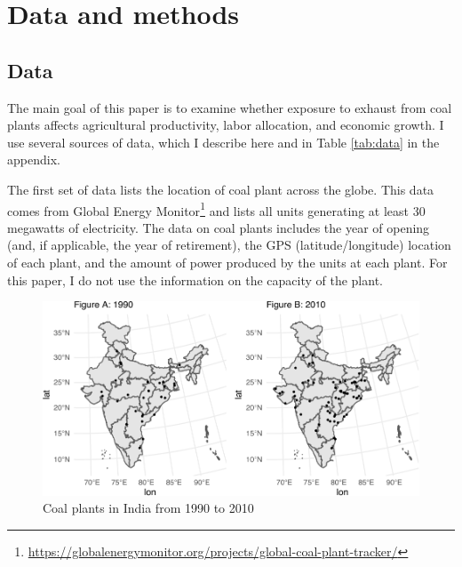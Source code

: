 \documentclass[
]{article}
\begin{document}
\hypertarget{data-and-methods}{%
\section{\texorpdfstring{Data and methods \label{data}}{Data and methods }}\label{data-and-methods}}

\hypertarget{data}{%
\subsection{\texorpdfstring{Data \label{data2}}{Data }}\label{data}}

The main goal of this paper is to examine whether exposure to exhaust from coal plants affects agricultural productivity, labor allocation, and economic growth. I use several sources of data, which I describe here and in Table \ref{tab:data} in the appendix.

The first set of data lists the location of coal plant across the globe. This data comes from Global Energy Monitor\footnote{\url{https://globalenergymonitor.org/projects/global-coal-plant-tracker/}} and lists all units generating at least 30 megawatts of electricity. The data on coal plants includes the year of opening (and, if applicable, the year of retirement), the GPS (latitude/longitude) location of each plant, and the amount of power produced by the units at each plant. For this paper, I do not use the information on the capacity of the plant.

\begin{figure}
\includegraphics{draft_files/figure-latex/plants-1} \caption[Coal plants in India from 1990 to 2010]{Coal plants in India from 1990 to 2010}\label{fig:plants}
\end{figure}
\end{document}
